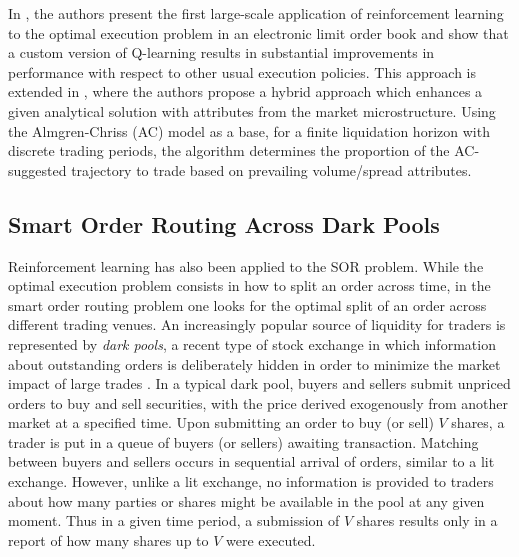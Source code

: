 In \cite{nevmyvaka2006reinforcement}, the authors present the first large-scale application of reinforcement learning to the optimal execution problem in an electronic limit order book and show that a custom version of Q-learning results in substantial improvements in performance with respect to other usual execution policies. This approach is extended in \cite{hendricks2014reinforcement}, where the authors propose a hybrid approach which enhances a given analytical solution with attributes from the market microstructure. Using the Almgren-Chriss (AC) model \cite{almgren2001optimal} as a base, for a finite liquidation horizon with discrete trading periods, the algorithm determines the proportion of the AC-suggested trajectory to trade based on prevailing volume/spread attributes.  

\subsection{Smart Order Routing Across Dark Pools}
Reinforcement learning has also been applied to the \gls{SOR} problem. While the optimal execution problem consists in how to split an order across time, in the smart order routing problem one looks for the optimal split of an order across different trading venues. An increasingly popular source of liquidity for traders is represented by \emph{dark pools}, a recent type of stock exchange in which information about outstanding orders is deliberately hidden in order to minimize the market impact of large trades \cite{cartea2015algorithmic}. In a typical dark pool, buyers and sellers submit unpriced orders to buy and sell securities, with the price derived exogenously from another market at a specified time. Upon submitting an order to buy (or sell) $V$ shares, a trader is put in a queue of buyers (or sellers) awaiting transaction. Matching between buyers and sellers occurs in sequential arrival of orders, similar to a lit exchange. However, unlike a lit exchange, no information is provided to traders about how many parties or shares might be available in the pool at any given moment. Thus in a given time period, a submission of $V$ shares results only in a report of how many shares up to $V$ were executed.\\
